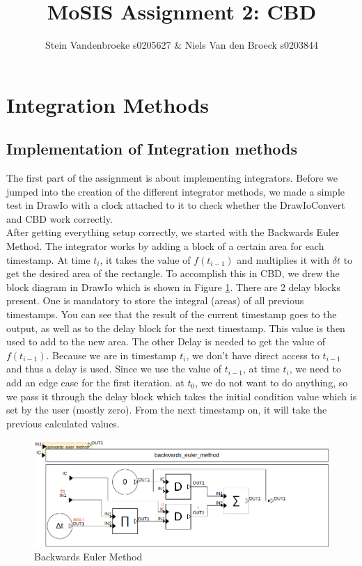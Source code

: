 \documentclass{article}
\title{MoSIS Assignment 2: CBD}
\author{Stein Vandenbroeke s0205627 & Niels Van den Broeck s0203844}
\begin{document}
\maketitle


\section{Integration Methods}

\subsection{Implementation of Integration methods}
The first part of the assignment is about implementing integrators. Before we jumped into the creation of the different integrator methods, we made a simple test in DrawIo with a clock attached to it to check whether the DrawIoConvert and CBD work correctly. \\

After getting everything setup correctly, we started with the Backwards Euler Method. The integrator works by adding a block of a certain area for each timestamp. At time $t_{i}$, it takes the value of $f(t_{i-1})$ and multiplies it with $\delta t$ to get the desired area of the rectangle. To accomplish this in CBD, we drew the block diagram in DrawIo which is shown in Figure \ref{fig:backwards_euler}. There are 2 delay blocks present. One is mandatory to store the integral (areas) of all previous timestamps. You can see that the result of the current timestamp goes to the output, as well as to the delay block for the next timestamp. This value is then used to add to the new area. The other Delay is needed to get the value of $f(t_{i-1})$. Because we are in timestamp $t_{i}$, we don't have direct access to $t_{i-1}$ and thus a delay is used. Since we use the value of $t_{i-1}$, at time $t_{i}$, we need to add an edge case for the first iteration. at $t_{0}$, we do not want to do anything, so we pass it through the delay block which takes the initial condition value which is set by the user (mostly zero). From the next timestamp on, it will take the previous calculated values.\\

\begin{figure}
    \centering
    \includegraphics[width=0.75\linewidth]{Images/Backwards_Euler_Method.drawio.png}
    \caption{Backwards Euler Method}
    \label{fig:backwards_euler}
\end{figure}
\end{document}
